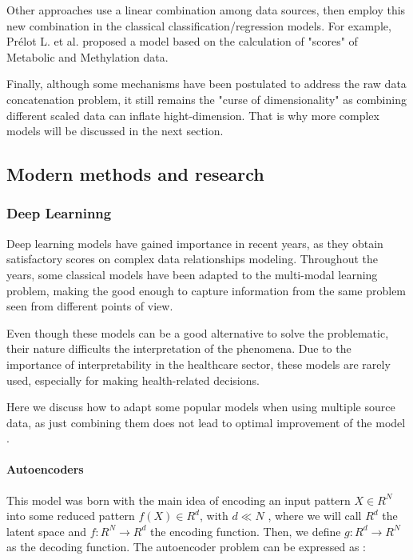 \documentclass[11pt,a4paper]{article}
\begin{document}

Other approaches use a linear combination among data sources, then employ this new combination in the classical classification/regression models. For example, Prélot L. et al. \cite{prelotYEARglycaemic} proposed a model based on the calculation of "scores" of Metabolic and Methylation data. 

Finally, although some mechanisms have been postulated to address the raw data concatenation problem, it still remains the "curse of dimensionality" as combining different scaled data can inflate hight-dimension. That is why more complex models will be discussed in the next section.  

\subsection{Modern methods and research}


\subsubsection{Deep Learninng}

Deep learning models have gained importance in recent years, as they obtain satisfactory scores on complex data relationships modeling. Throughout the years, some classical models have been adapted to the multi-modal learning problem, making the good enough to capture information from the same problem seen from different points of view. 

Even though these models can be a good alternative to solve the problematic, their nature difficults the interpretation of the phenomena. Due to the importance of interpretability in the healthcare sector, these models are rarely used, especially for making health-related decisions. 

Here we discuss how to adapt some popular models when using multiple source data, as just combining them does not lead to optimal improvement of the model \citep{yan2021deepmvl}.

\paragraph{Autoencoders}

 This model was born with the main idea of encoding an input pattern $X \in R^N$ into some reduced pattern $f(X) \in R^d$, with $ d\ll N$ \cite{rumelhart1986pdp}, where we will call $R^d$ the latent space and $f : R^N \rightarrow R^d$ the encoding function. Then, we define $g : R^d \rightarrow R^N$ as the decoding function. The autoencoder problem can be expressed as \cite{baldi2012autoencoders}:
\end{document}
